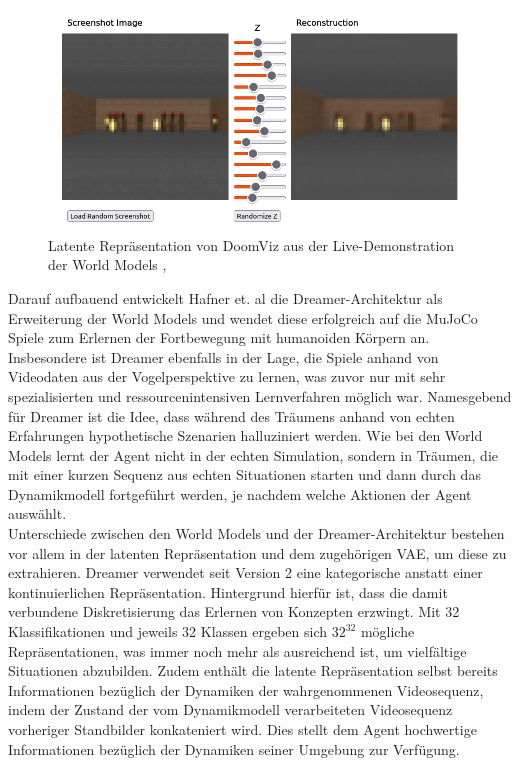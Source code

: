 \begin{figure}[h]
  \centering
  \includegraphics[width = 1.0\textwidth]{imgs/doomviz_latents}
  \caption{Latente Repräsentation von DoomViz aus der Live-Demonstration der World Models \cite{NEURIPS2018_2de5d166}, \cite{worldmodels2023diffdriveimg}}
  \label{img:DoomViz}
\end{figure}

Darauf aufbauend entwickelt Hafner et. al die Dreamer-Architektur als Erweiterung der
World Models und wendet diese erfolgreich auf die MuJoCo Spiele zum Erlernen der
Fortbewegung mit humanoiden Körpern an. Insbesondere ist Dreamer ebenfalls in der Lage,
die Spiele anhand von Videodaten aus der Vogelperspektive zu lernen, was zuvor nur mit
sehr spezialisierten und ressourcenintensiven Lernverfahren möglich war. Namesgebend
für Dreamer ist die Idee, dass während des Träumens anhand von echten Erfahrungen
hypothetische Szenarien halluziniert werden. Wie bei den World Models lernt der Agent
nicht in der echten Simulation, sondern in Träumen, die mit einer kurzen Sequenz aus
echten Situationen starten und dann durch das Dynamikmodell fortgeführt werden,
je nachdem welche Aktionen der Agent auswählt.\\

Unterschiede zwischen den World Models und der Dreamer-Architektur bestehen vor allem
in der latenten Repräsentation und dem zugehörigen VAE, um diese zu extrahieren. Dreamer
verwendet seit Version 2 eine kategorische anstatt einer kontinuierlichen Repräsentation.
Hintergrund hierfür ist, dass die damit verbundene Diskretisierung das Erlernen von
Konzepten erzwingt. Mit 32 Klassifikationen und jeweils 32 Klassen ergeben sich $32^{32}$
mögliche Repräsentationen, was immer noch mehr als ausreichend ist, um vielfältige
Situationen abzubilden. Zudem enthält die latente Repräsentation selbst bereits
Informationen bezüglich der Dynamiken der wahrgenommenen Videosequenz, indem der Zustand
der vom Dynamikmodell verarbeiteten Videosequenz vorheriger Standbilder konkateniert wird.
Dies stellt dem Agent hochwertige Informationen bezüglich der Dynamiken seiner Umgebung
zur Verfügung.\\

